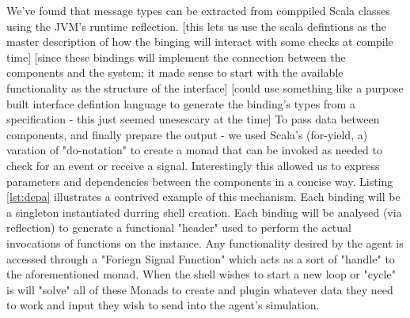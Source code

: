 We've found that message types can be extracted from comppiled Scala classes using the JVM's runtime reflection.
    [this lets us use the scala defintions as the master description of how the binging will interact with some checks at compile time]
        [since these bindings will implement the connection between the components and the system; it made sense to start with the available functionality as the structure of the interface]
        [could use something like a purpose built interface defintion language to generate the binding's types from a specification - this just seemed unesescary at the time]
To pass data between components, and finally prepare the output - we used Scala's (for-yield, a) varation of "do-notation" to create a monad that can be invoked as needed to check for an event or receive a signal.
    Interestingly this allowed us to express parameters and dependencies between the components in a concise way.
    Listing \ref{lst:depa} illustrates a contrived example of this mechanism.
Each binding will be a singleton instantiated durring shell creation.
    Each binding will be analysed (via reflection) to generate a functional "header" used to perform the actual invocations of functions on the instance.
    Any functionality desired by the agent is accessed through a "Foriegn Signal Function" which acts as a sort of "handle" to the aforementioned monad.
    When the shell wishes to start a new loop or "cycle" is will "solve" all of these Monads to create and plugin whatever data they need to work and input they wish to send into the agent's simulation.

